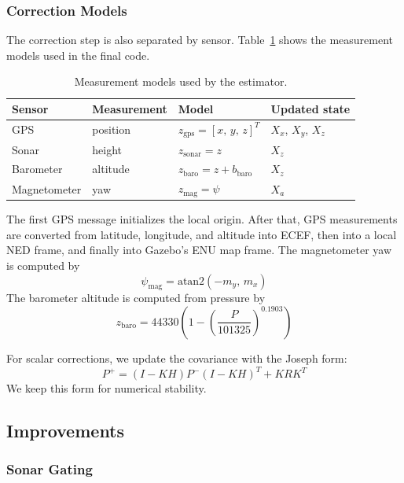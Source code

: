 \documentclass[12pt,twoside,letterpaper]{article}
\begin{document}
\subsubsection{Correction Models}

The correction step is also separated by sensor. Table~\ref{tab:estimator_measurements} shows the measurement models used in the final code.

\begin{table}[!t]
    \centering
    \small
    \setlength{\tabcolsep}{6pt}
    \caption{Measurement models used by the estimator.}
    \label{tab:estimator_measurements}
    \vspace{0.1cm}
    \begin{tabular}{llll}
        \toprule
        \textbf{Sensor} & \textbf{Measurement} & \textbf{Model} & \textbf{Updated state} \\
        \midrule
        GPS & position & $z_{\text{gps}} = [x,\, y,\, z]^T$ & $X_x$, $X_y$, $X_z$ \\
        Sonar & height & $z_{\text{sonar}} = z$ & $X_z$ \\
        Barometer & altitude & $z_{\text{baro}} = z + b_{\text{baro}}$ & $X_z$ \\
        Magnetometer & yaw & $z_{\text{mag}} = \psi$ & $X_a$ \\
        \bottomrule
    \end{tabular}
\end{table}

The first GPS message initializes the local origin. After that, GPS measurements are converted from latitude, longitude, and altitude into ECEF, then into a local NED frame, and finally into Gazebo's ENU map frame. The magnetometer yaw is computed by
\[
    \psi_{\text{mag}} = \text{atan2}(-m_y,\, m_x)
\]
The barometer altitude is computed from pressure by
\[
    z_{\text{baro}} = 44330 \left(1 - \left(\frac{P}{101325}\right)^{0.1903}\right)
\]

For scalar corrections, we update the covariance with the Joseph form:
\[
    P^+ = (I - KH)P^-(I - KH)^T + KRK^T
\]
We keep this form for numerical stability.

\subsection{Improvements}

\subsubsection{Sonar Gating}
\end{document}
